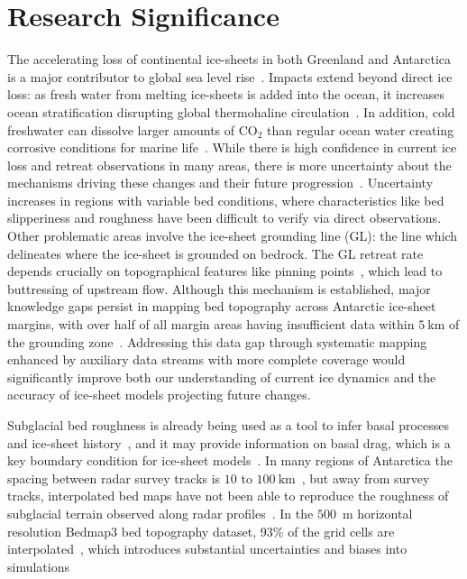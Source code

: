 \chapter{Research Significance}

The accelerating loss of continental ice-sheets in both Greenland and Antarctica is a major contributor to global sea level rise~\cite{Meredith_2019}. Impacts extend beyond direct ice loss: as fresh water from melting ice-sheets is added into the ocean, it increases ocean stratification disrupting global thermohaline circulation~\cite{Jacobs_2004}. In addition, cold freshwater can dissolve larger amounts of $\mathrm{CO_2}$ than regular ocean water creating corrosive conditions for marine life~\cite{Meredith_2019}.
While there is high confidence in current ice loss and retreat observations in many areas, there is more uncertainty about the mechanisms driving these changes and their future progression~\cite{Fox-Kemper_2021}. Uncertainty increases in regions with variable bed conditions, where characteristics like bed slipperiness and roughness have been difficult to verify via direct observations. Other problematic areas involve the ice-sheet grounding line (GL): the line which delineates where the ice-sheet is grounded on bedrock. The GL retreat rate depends crucially on topographical features like pinning points~\cite{Fox-Kemper_2021}, which lead to buttressing of upstream flow. Although this mechanism is established, major knowledge gaps persist in mapping bed topography across Antarctic ice-sheet margins, with over half of all margin areas having insufficient data within $5~\mathrm{km}$ of the grounding zone~\cite{RINGS_2022}. Addressing this data gap through systematic mapping enhanced by auxiliary data streams with more complete coverage would significantly improve both our understanding of current ice dynamics and the accuracy of ice-sheet models projecting future changes.

Subglacial bed roughness is already being used as a tool to infer basal processes and ice-sheet history~\cite{Bingham_2009}, and it may provide information on basal drag, which is a key boundary condition for ice-sheet models~\cite{Ockenden_2026}. In many regions of Antarctica the spacing between radar survey tracks is $10$ to $100~\mathrm{km}$~\cite{Ockenden_2026}, but away from survey tracks, interpolated bed maps have not been able to reproduce the roughness of subglacial terrain observed along radar profiles~\cite{Ockenden_2026}. In the $500$~m horizontal resolution Bedmap3 bed topography dataset, 93\% of the grid cells are interpolated~\cite{Pritchard_2025}, which introduces substantial uncertainties and biases into simulations

